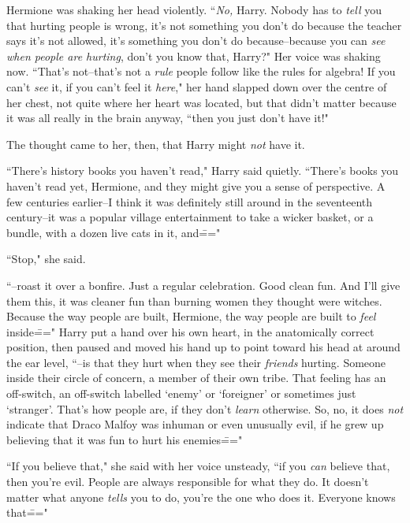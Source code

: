 Hermione was shaking her head violently. ``\emph{No,} Harry. Nobody has to \emph{tell} you that hurting people is wrong, it's not something you don't do because the teacher says it's not allowed, it's something you don't do because\---because you can \emph{see when people are hurting}, don't you know that, Harry?" Her voice was shaking now. ``That's not\---that's not a \emph{rule} people follow like the rules for algebra! If you can't \emph{see} it, if you can't feel it \emph{here}," her hand slapped down over the centre of her chest, not quite where her heart was located, but that didn't matter because it was all really in the brain anyway, ``then you just don't have it!"

The thought came to her, then, that Harry might \emph{not} have it.

``There's history books you haven't read," Harry said quietly. ``There's books you haven't read yet, Hermione, and they might give you a sense of perspective. A few centuries earlier\---I think it was definitely still around in the seventeenth century\---it was a popular village entertainment to take a wicker basket, or a bundle, with a dozen live cats in it, and\==="

``Stop," she said.

``\---roast it over a bonfire. Just a regular celebration. Good clean fun. And I'll give them this, it was cleaner fun than burning women they thought were witches. Because the way people are built, Hermione, the way people are built to \emph{feel} inside\===" Harry put a hand over his own heart, in the anatomically correct position, then paused and moved his hand up to point toward his head at around the ear level, ``\---is that they hurt when they see their \emph{friends} hurting. Someone inside their circle of concern, a member of their own tribe. That feeling has an off-switch, an off-switch labelled `enemy' or `foreigner' or sometimes just `stranger'. That's how people are, if they don't \emph{learn} otherwise. So, no, it does \emph{not} indicate that Draco Malfoy was inhuman or even unusually evil, if he grew up believing that it was fun to hurt his enemies\==="

``If you believe that," she said with her voice unsteady, ``if you \emph{can} believe that, then you're evil. People are always responsible for what they do. It doesn't matter what anyone \emph{tells} you to do, you're the one who does it. Everyone knows that\==="

